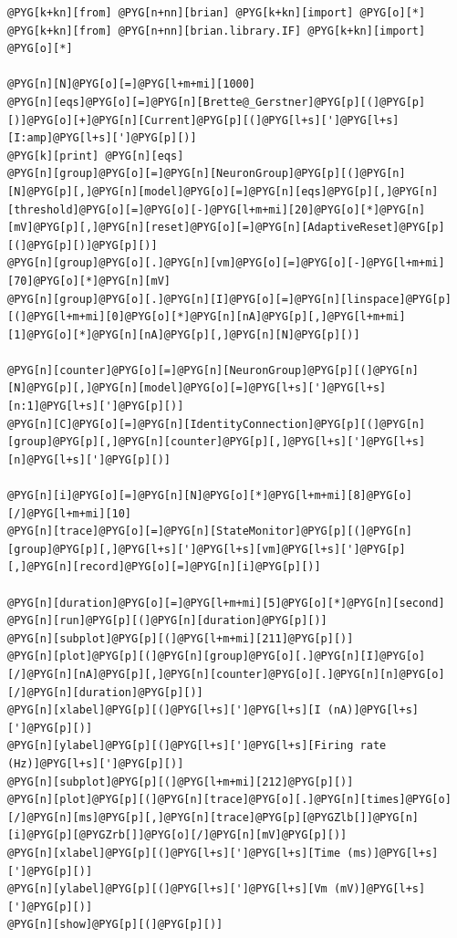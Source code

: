 \documentclass[letterpaper,10pt,english]{manual}
\begin{document}
\begin{Verbatim}[commandchars=@\[\]]
@PYG[k+kn][from] @PYG[n+nn][brian] @PYG[k+kn][import] @PYG[o][*]
@PYG[k+kn][from] @PYG[n+nn][brian.library.IF] @PYG[k+kn][import] @PYG[o][*]

@PYG[n][N]@PYG[o][=]@PYG[l+m+mi][1000]
@PYG[n][eqs]@PYG[o][=]@PYG[n][Brette@_Gerstner]@PYG[p][(]@PYG[p][)]@PYG[o][+]@PYG[n][Current]@PYG[p][(]@PYG[l+s][']@PYG[l+s][I:amp]@PYG[l+s][']@PYG[p][)]
@PYG[k][print] @PYG[n][eqs]
@PYG[n][group]@PYG[o][=]@PYG[n][NeuronGroup]@PYG[p][(]@PYG[n][N]@PYG[p][,]@PYG[n][model]@PYG[o][=]@PYG[n][eqs]@PYG[p][,]@PYG[n][threshold]@PYG[o][=]@PYG[o][-]@PYG[l+m+mi][20]@PYG[o][*]@PYG[n][mV]@PYG[p][,]@PYG[n][reset]@PYG[o][=]@PYG[n][AdaptiveReset]@PYG[p][(]@PYG[p][)]@PYG[p][)]
@PYG[n][group]@PYG[o][.]@PYG[n][vm]@PYG[o][=]@PYG[o][-]@PYG[l+m+mi][70]@PYG[o][*]@PYG[n][mV]
@PYG[n][group]@PYG[o][.]@PYG[n][I]@PYG[o][=]@PYG[n][linspace]@PYG[p][(]@PYG[l+m+mi][0]@PYG[o][*]@PYG[n][nA]@PYG[p][,]@PYG[l+m+mi][1]@PYG[o][*]@PYG[n][nA]@PYG[p][,]@PYG[n][N]@PYG[p][)]

@PYG[n][counter]@PYG[o][=]@PYG[n][NeuronGroup]@PYG[p][(]@PYG[n][N]@PYG[p][,]@PYG[n][model]@PYG[o][=]@PYG[l+s][']@PYG[l+s][n:1]@PYG[l+s][']@PYG[p][)]
@PYG[n][C]@PYG[o][=]@PYG[n][IdentityConnection]@PYG[p][(]@PYG[n][group]@PYG[p][,]@PYG[n][counter]@PYG[p][,]@PYG[l+s][']@PYG[l+s][n]@PYG[l+s][']@PYG[p][)]

@PYG[n][i]@PYG[o][=]@PYG[n][N]@PYG[o][*]@PYG[l+m+mi][8]@PYG[o][/]@PYG[l+m+mi][10]
@PYG[n][trace]@PYG[o][=]@PYG[n][StateMonitor]@PYG[p][(]@PYG[n][group]@PYG[p][,]@PYG[l+s][']@PYG[l+s][vm]@PYG[l+s][']@PYG[p][,]@PYG[n][record]@PYG[o][=]@PYG[n][i]@PYG[p][)]

@PYG[n][duration]@PYG[o][=]@PYG[l+m+mi][5]@PYG[o][*]@PYG[n][second]
@PYG[n][run]@PYG[p][(]@PYG[n][duration]@PYG[p][)]
@PYG[n][subplot]@PYG[p][(]@PYG[l+m+mi][211]@PYG[p][)]
@PYG[n][plot]@PYG[p][(]@PYG[n][group]@PYG[o][.]@PYG[n][I]@PYG[o][/]@PYG[n][nA]@PYG[p][,]@PYG[n][counter]@PYG[o][.]@PYG[n][n]@PYG[o][/]@PYG[n][duration]@PYG[p][)]
@PYG[n][xlabel]@PYG[p][(]@PYG[l+s][']@PYG[l+s][I (nA)]@PYG[l+s][']@PYG[p][)]
@PYG[n][ylabel]@PYG[p][(]@PYG[l+s][']@PYG[l+s][Firing rate (Hz)]@PYG[l+s][']@PYG[p][)]
@PYG[n][subplot]@PYG[p][(]@PYG[l+m+mi][212]@PYG[p][)]
@PYG[n][plot]@PYG[p][(]@PYG[n][trace]@PYG[o][.]@PYG[n][times]@PYG[o][/]@PYG[n][ms]@PYG[p][,]@PYG[n][trace]@PYG[p][@PYGZlb[]]@PYG[n][i]@PYG[p][@PYGZrb[]]@PYG[o][/]@PYG[n][mV]@PYG[p][)]
@PYG[n][xlabel]@PYG[p][(]@PYG[l+s][']@PYG[l+s][Time (ms)]@PYG[l+s][']@PYG[p][)]
@PYG[n][ylabel]@PYG[p][(]@PYG[l+s][']@PYG[l+s][Vm (mV)]@PYG[l+s][']@PYG[p][)]
@PYG[n][show]@PYG[p][(]@PYG[p][)]
\end{Verbatim}
\end{document}
